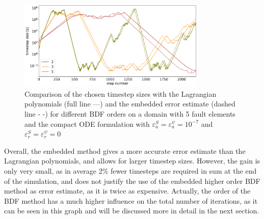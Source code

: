 \begin{figure}[H]
	\centering
	\includegraphics[width=0.8\textwidth]{images/TANDEMTimeAnalysisDifferentBDFOrdersEmbedded_vs_Lagrange_CompactODE_Size5.png}
	\caption{Comparison of the chosen timestep sizes with the Lagrangian polynomials (full line ---) and the embedded error estimate (dashed line - -) for different BDF orders on a domain with 5 fault elements and the compact ODE formulation with $\varepsilon^S_a = \varepsilon^{\psi}_a = 10^{-7}$ and $\varepsilon^S_r = \varepsilon^{\psi}_r = 0$ }
	\label{fig:BDFOrders_Lagrange_vs_Embedded_compact_ODE}
\end{figure}
Overall, the embedded method gives a more accurate error estimate than the Lagrangian polynomials, and allows for larger timestep sizes. However, the gain is only very small, as in average 2\% fewer timesteps are required in sum at the end of the simulation, and does not justify the use of the embedded higher order BDF method as error estimate, as it is twice as expensive. Actually, the order of the BDF method has a much higher influence on the total number of iterations, as it can be seen in this graph and will be discussed more in detail in the next section. 


